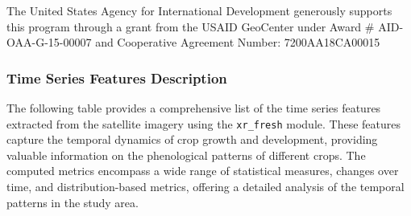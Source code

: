 \documentclass[
  journal,
  twocolumn]{IEEEtran}
\begin{document}
The United States Agency for International Development generously
supports this program through a grant from the USAID GeoCenter under
Award \# AID-OAA-G-15-00007 and Cooperative Agreement Number:
7200AA18CA00015

\subsubsection{Time Series Features
Description}\label{time-series-features-description}

The following table provides a comprehensive list of the time series
features extracted from the satellite imagery using the
\texttt{xr\_fresh} module. These features capture the temporal dynamics
of crop growth and development, providing valuable information on the
phenological patterns of different crops. The computed metrics encompass
a wide range of statistical measures, changes over time, and
distribution-based metrics, offering a detailed analysis of the temporal
patterns in the study area.
\end{document}
